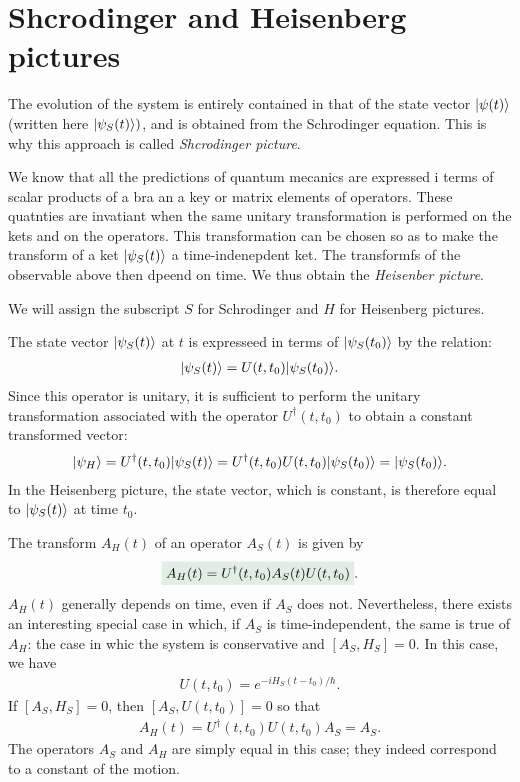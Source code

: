 \section{Shcrodinger and Heisenberg pictures}

The evolution of the system is entirely contained in that of the state vector $|\psi(t)\rangle$ (written here $|\psi_S(t)\rangle)$, and 
is obtained from the Schrodinger equation. This is why this approach is called \emph{Shcrodinger picture}.

We know that all the predictions of quantum mecanics are expressed i terms of scalar products of a bra an a key or matrix elements of operators.
These quatnties are invatiant when the same unitary transformation is performed on the kets and on the operators. This transformation can be chosen so 
as to make the transform of a ket $|\psi_S(t)\rangle$ a time-indenepdent ket.
The transformfs of the observable above then dpeend on time. We thus obtain the \emph{Heisenber picture}.

We will assign the subscript $S$ for Schrodinger and $H$ for Heisenberg pictures.

The state vector $|\psi_S(t)\rangle$ at $t$ is expresseed in terms of $|\psi_S(t_0)\rangle$ by the relation:
\begin{align*}
    |\psi_S(t)\rangle=U(t,t_0)|\psi_S(t_0)\rangle.
\end{align*}
Since this operator is unitary, it is sufficient to perform the unitary transformation associated with the operator $U^\dagger(t,t_0)$ to obtain
a constant transformed vector:
\begin{align*}
    |\psi_H\rangle=U^\dagger(t,t_0)|\psi_S(t)\rangle=U^\dagger(t,t_0)U(t,t_0)|\psi_S(t_0)\rangle=|\psi_S(t_0)\rangle.
\end{align*}
In the Heisenberg picture, the state vector, which is constant, is therefore equal to $|\psi_S(t)\rangle$ at time $t_0$.

The transform $A_H(t)$ of an operator $A_S(t)$ is given by
\begin{align*}
    \highlight{A_H(t)=U^\dagger(t,t_0)A_S(t)U(t,t_0)}.
\end{align*}
$A_H(t)$ generally depends on time, even if $A_S$ does not. Nevertheless, there exists an interesting special case in which, if $A_S$ is 
time-independent, the same is true of $A_H$: the case in whic the system is conservative and $[A_S,H_S]=0$. In this case, we have 
\begin{align*}
    U(t,t_0)=e^{-iH_S(t-t_0)/\hbar}.
\end{align*}
If $[A_S,H_S]=0$, then $[A_S,U(t,t_0)]=0$ so that 
\begin{align*}
    A_H(t)=U^\dagger(t,t_0)U(t,t_0)A_S=A_S.
\end{align*} 
The operators $A_S$ and $A_H$ are simply equal in this case; they indeed correspond to a constant of the motion.

